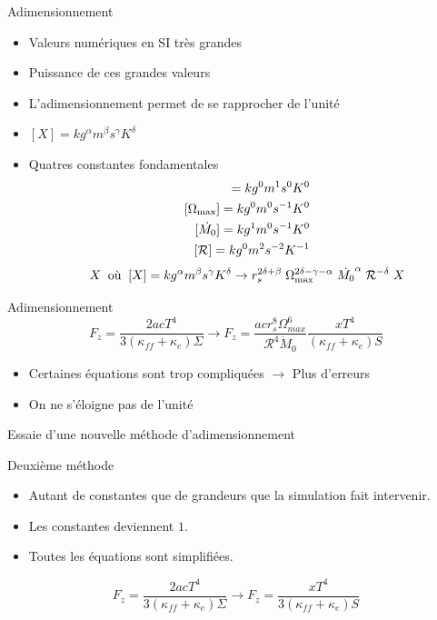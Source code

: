 \documentclass{beamer}
\begin{document}
\begin{frame}{Adimensionnement}
\begin{itemize}
	\item Valeurs numériques en SI très grandes
	\item Puissance de ces grandes valeurs
	\item L'adimensionnement permet de se rapprocher de l'unité
	\item $[X]=kg^{\alpha}m^{\beta}s^{\gamma}K^{\delta}$
	\item Quatres constantes fondamentales
	\begin{align}
		[r_s]=kg^{0}m^{1}s^{0}K^{0}\\
		[\Omega_{\rm{max}}]=kg^{0}m^{0}s^{-1}K^{0}\\
		[\dot{M_0}]=kg^{1}m^{0}s^{-1}K^{0}\\
		[\mathcal{R}]=kg^{0}m^{2}s^{-2}K^{-1}
	\end{align}
	\begin{equation}
	  X\;\;\textrm{où}\;\;[X]=kg^{\alpha}m^{\beta}s^{\gamma}K^{\delta} \rightarrow r_s^{2\delta+\beta}\;\Omega_{\rm{max}}^{2\delta-\gamma-\alpha}\;\dot{M_0}^{\alpha}\;\mathcal{R}^{-\delta}\;X
	\end{equation}
\end{itemize}
\end{frame}

\begin{frame}{Adimensionnement}
	\begin{equation}
		F_z=\frac{2acT^4}{3(\kappa_{ff}+\kappa_e)\Sigma}\rightarrow F_z=\frac{acr_s^8\Omega_{max}^6}{\mathcal{R}^4\dot{M}_0}\frac{xT^4}{(\kappa_{ff}+\kappa_e)S}
	\end{equation}
	\begin{itemize}
	  \item Certaines équations sont trop compliquées $\rightarrow$ Plus d'erreurs
	  \item On ne s'éloigne pas de l'unité
	\end{itemize}
	Essaie d'une nouvelle méthode d'adimensionnement
\end{frame}

\begin{frame}{Deuxième méthode}
\begin{itemize}
  \item Autant de constantes que de grandeurs que la simulation fait intervenir.
  \item Les constantes deviennent $1$.
  \item Toutes les équations sont simplifiées.
\end{itemize}
	\begin{equation}
		F_z=\frac{2acT^4}{3(\kappa_{ff}+\kappa_e)\Sigma}\rightarrow F_z=\frac{xT^4}{3(\kappa_{ff}+\kappa_e)S}
	\end{equation}
\end{frame}
\end{document}
